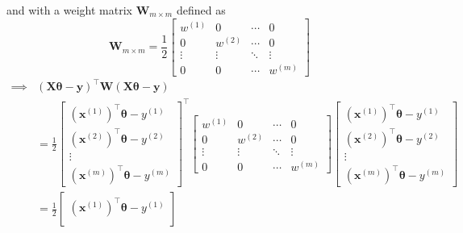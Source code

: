 and with a weight matrix \( \mathbf{W}_{m \times m} \) defined as
\begin{equation*}
    \mathbf{W}_{m \times m}
    =
    \frac{1}{2}
    \begin{bmatrix}
        w^{(1)} & 0       & \cdots & 0       \\
        0       & w^{(2)} & \cdots & 0       \\
        \vdots  & \vdots  & \ddots & \vdots  \\
        0       & 0       & \cdots & w^{(m)}
    \end{bmatrix}
\end{equation*}
\begin{align*}
    \implies
     &
    {(\mathbf{X} \boldsymbol{\theta} - \mathbf{y})}^\top \mathbf{W} (\mathbf{X} \boldsymbol{\theta} - \mathbf{y})
    \\ & =
    \frac{1}{2}
    \begin{bmatrix}
        {\left(\mathbf{x}^{(1)}\right)}^\top \boldsymbol{\theta} - y^{(1)} \\
        {\left(\mathbf{x}^{(2)}\right)}^\top \boldsymbol{\theta} - y^{(2)} \\
        \vdots                                                             \\
        {\left(\mathbf{x}^{(m)}\right)}^\top \boldsymbol{\theta} - y^{(m)}
    \end{bmatrix}^\top
    \begin{bmatrix}
        w^{(1)} & 0       & \cdots & 0       \\
        0       & w^{(2)} & \cdots & 0       \\
        \vdots  & \vdots  & \ddots & \vdots  \\
        0       & 0       & \cdots & w^{(m)}
    \end{bmatrix}
    \begin{bmatrix}
        {\left(\mathbf{x}^{(1)}\right)}^\top \boldsymbol{\theta} - y^{(1)} \\
        {\left(\mathbf{x}^{(2)}\right)}^\top \boldsymbol{\theta} - y^{(2)} \\
        \vdots                                                             \\
        {\left(\mathbf{x}^{(m)}\right)}^\top \boldsymbol{\theta} - y^{(m)}
    \end{bmatrix}
    \\ & =
    \frac{1}{2}
    \begin{bmatrix}
        {\left(\mathbf{x}^{(1)}\right)}^\top \boldsymbol{\theta} - y^{(1)} \\

\end{bmatrix}
\end{align*}
